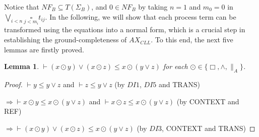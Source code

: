 \documentclass{elsarticle}
\theoremstyle{plain}
\newtheorem{lemma}[theorem]{Lemma}
\theoremstyle{definition}
\begin{document}
Notice that $NF_B \subseteq T(\Sigma_B)$, and $0\in NF_B$ by taking $n=1$ and $m_0 = 0$ in $ \underset{i<n}{\bigvee}\underset{j<m_i}{\square}t_{ij}$.
In the following, we will show that each process term can be transformed using the equations into a normal form, which is a crucial step in establishing the ground-completeness of $AX_{CLL}$.
To this end, the next five lemmas are firstly proved.

\begin{lemma}\label{L:DIS_INEQUATION}
  $\vdash (x\odot y)\vee(x\odot z)\leqslant x \odot (y \vee z)$ for each $\odot \in \{\Box, \wedge, \parallel_A\}$.
\end{lemma}
\begin{proof}
  $\vdash y \leqslant y \vee z$ and $\vdash z \leqslant y \vee z$  \qquad\qquad\qquad(by $DI1$, $DI5$ and TRANS)

\noindent   $\Rightarrow \vdash x \odot y \leqslant x \odot (y \vee z)$ and $\vdash x\odot z \leqslant x\odot (y \vee z)$ (by CONTEXT and REF)

\noindent  $\Rightarrow \vdash (x \odot y) \vee (x\odot z) \leqslant x \odot (y \vee z)$ \qquad \qquad (by $DI3$, CONTEXT and TRANS)
\end{proof}
\end{document}
